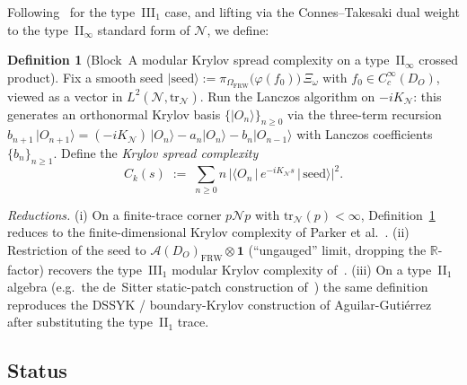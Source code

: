\documentclass[11pt]{article}
\theoremstyle{definition}
\newtheorem{definition}[theorem]{Definition}
\newcommand{\R}{\mathbb{R}}
\renewcommand{\AA}{\mathcal{A}}
\newcommand{\NN}{\mathcal{N}}
\newcommand{\FRW}{\mathrm{FRW}}
\begin{document}
Following~\cite{CMPT24} for the type~III$_1$ case, and lifting via
the Connes--Takesaki dual weight to the type~II$_\infty$ standard
form of $\NN$, we define:

\begin{definition}[Block~A modular Krylov spread complexity on a type~II$_\infty$ crossed product]\label{def:Ck}
Fix a smooth seed
\(\lvert\mathrm{seed}\rangle := \pi_{\Omega_\FRW}\!\big(\varphi(f_0)\big)\,\Xi_\omega\)
with $f_0 \in C_c^\infty(D_O)$, viewed as a vector in
$L^2(\NN, \mathrm{tr}_\NN)$. Run the Lanczos algorithm on
$-iK_\NN$: this generates an orthonormal Krylov basis
$\{\lvert O_n\rangle\}_{n\ge 0}$ via the three-term recursion
\(b_{n+1}\,\lvert O_{n+1}\rangle = (-iK_\NN)\,\lvert O_n\rangle - a_n\lvert O_n\rangle - b_n\lvert O_{n-1}\rangle\)
with Lanczos coefficients $\{b_n\}_{n\ge 1}$. Define the
\emph{Krylov spread complexity}
\begin{equation}\label{eq:Ck-def}
C_k(s) \;:=\; \sum_{n\ge 0} n\,\big\lvert\langle O_n\,\lvert\, e^{-iK_\NN s}\,\lvert\,\mathrm{seed}\rangle\big\rvert^2.
\end{equation}
\end{definition}

\noindent\emph{Reductions.}
(i) On a finite-trace corner $p\NN p$ with $\mathrm{tr}_\NN(p) <
\infty$, Definition~\ref{def:Ck} reduces to the finite-dimensional
Krylov complexity of Parker et al.~\cite{ParkerEtAl2019}.
(ii) Restriction of the seed to $\AA(D_O)_\FRW \otimes \mathbf{1}$
(``ungauged'' limit, dropping the $\R$-factor) recovers the
type~III$_1$ modular Krylov complexity of~\cite{CMPT24}.
(iii) On a type~II$_1$ algebra (e.g.\ the de~Sitter static-patch
construction of~\cite{CLPW2023}) the same definition reproduces the
DSSYK / boundary-Krylov construction of
Aguilar-Guti\'errez~\cite{AguilarGutierrez2025} after substituting
the type~II$_1$ trace.

\subsection{Status}
\end{document}
